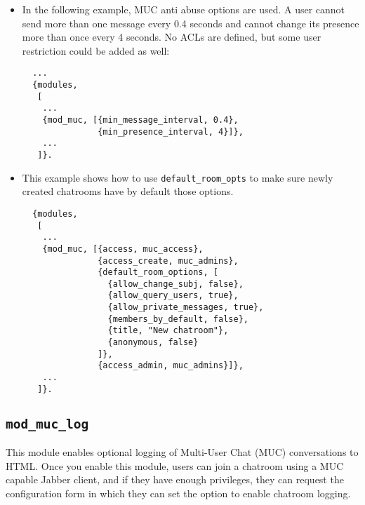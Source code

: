\documentclass[a4paper,10pt]{book}
\newcommand{\ind}[1]{\begin{latexonly}\index{#1}\end{latexonly}}
\newcommand{\option}[1]{\texttt{#1}}
\newcommand{\module}[1]{\texttt{#1}}
\newcommand{\modmuclog}{\module{mod\_muc\_log}}
\begin{document}
\begin{itemize}
\item In the following example, MUC anti abuse options are used. A
user cannot send more than one message every 0.4 seconds and cannot
change its presence more than once every 4 seconds. No ACLs are
defined, but some user restriction could be added as well:

  \begin{verbatim}
  ...
  {modules,
   [
    ...
    {mod_muc, [{min_message_interval, 0.4},
               {min_presence_interval, 4}]},
    ...
   ]}.
\end{verbatim}

\item This example shows how to use \option{default\_room\_opts} to make sure
  newly created chatrooms have by default those options.
  \begin{verbatim}
  {modules,
   [
    ...
    {mod_muc, [{access, muc_access},
               {access_create, muc_admins},
               {default_room_options, [
                 {allow_change_subj, false},
                 {allow_query_users, true},
                 {allow_private_messages, true},
                 {members_by_default, false},
                 {title, "New chatroom"},
                 {anonymous, false}
               ]},
               {access_admin, muc_admins}]},
    ...
   ]}.
\end{verbatim}
\end{itemize}

\subsection{\modmuclog{}}
\label{modmuclog}
\ind{modules!\modmuclog{}}

This module enables optional logging of Multi-User Chat (MUC) conversations to
HTML. Once you enable this module, users can join a chatroom using a MUC capable
Jabber client, and if they have enough privileges, they can request the
configuration form in which they can set the option to enable chatroom logging.
\end{document}
